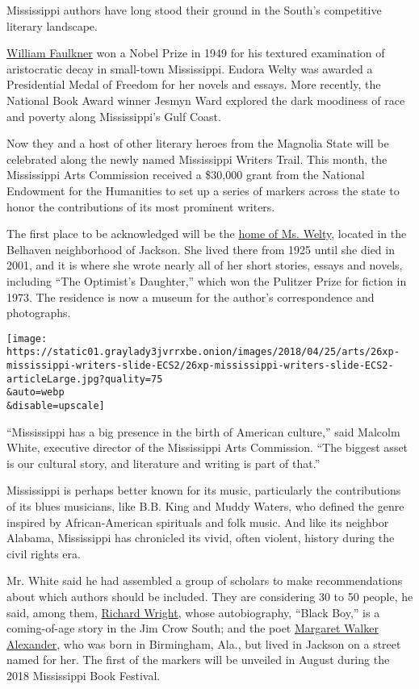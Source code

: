 Mississippi authors have long stood their ground in the South's
competitive literary landscape.

\href{https://www.nytimes3xbfgragh.onion/2012/07/01/magazine/how-william-faulkner-tackled-race-and-freed-the-south-from-itself.html}{William
Faulkner} won a Nobel Prize in 1949 for his textured examination of
aristocratic decay in small-town Mississippi. Eudora Welty was awarded a
Presidential Medal of Freedom for her novels and essays. More recently,
the National Book Award winner Jesmyn Ward explored the dark moodiness
of race and poverty along Mississippi's Gulf Coast.

Now they and a host of other literary heroes from the Magnolia State
will be celebrated along the newly named Mississippi Writers Trail. This
month, the Mississippi Arts Commission received a \$30,000 grant from
the National Endowment for the Humanities to set up a series of markers
across the state to honor the contributions of its most prominent
writers.

The first place to be acknowledged will be the
\href{https://eudorawelty.org/the-house/}{home of Ms. Welty}, located in
the Belhaven neighborhood of Jackson. She lived there from 1925 until
she died in 2001, and it is where she wrote nearly all of her short
stories, essays and novels, including ``The Optimist's Daughter,'' which
won the Pulitzer Prize for fiction in 1973. The residence is now a
museum for the author's correspondence and photographs.

\texttt{[image: https://static01.graylady3jvrrxbe.onion/images/2018/04/25/arts/26xp-mississippi-writers-slide-ECS2/26xp-mississippi-writers-slide-ECS2-articleLarge.jpg?quality=75\\\&auto=webp\\\&disable=upscale]}

``Mississippi has a big presence in the birth of American culture,''
said Malcolm White, executive director of the Mississippi Arts
Commission. ``The biggest asset is our cultural story, and literature
and writing is part of that.''

Mississippi is perhaps better known for its music, particularly the
contributions of its blues musicians, like B.B. King and Muddy Waters,
who defined the genre inspired by African-American spirituals and folk
music. And like its neighbor Alabama, Mississippi has chronicled its
vivid, often violent, history during the civil rights era.

Mr. White said he had assembled a group of scholars to make
recommendations about which authors should be included. They are
considering 30 to 50 people, he said, among them,
\href{https://www.britannica.com/biography/Richard-Wright-American-writer}{Richard
Wright}, whose autobiography, ``Black Boy,'' is a coming-of-age story in
the Jim Crow South; and the poet
\href{https://www.nytimes3xbfgragh.onion/1998/12/04/books/margaret-walker-alexander-83-professor-and-author-of-jubilee.html}{Margaret
Walker Alexander}, who was born in Birmingham, Ala., but lived in
Jackson on a street named for her. The first of the markers will be
unveiled in August during the 2018 Mississippi Book Festival.

